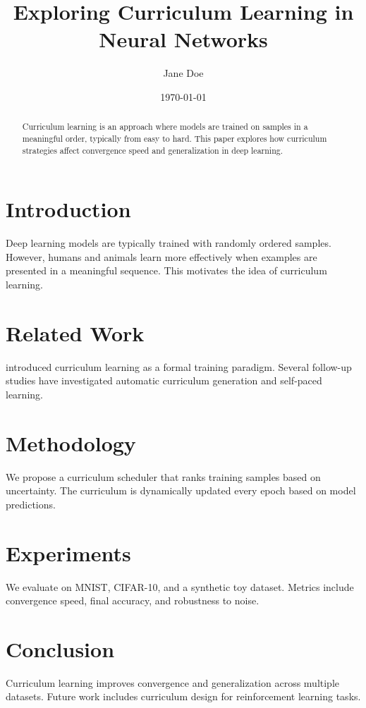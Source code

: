 \documentclass{article}
\title{Exploring Curriculum Learning in Neural Networks}
\author{Jane Doe}
\date{\today}
\begin{document}
\maketitle

\begin{abstract}
Curriculum learning is an approach where models are trained on samples in a meaningful order, typically from easy to hard. This paper explores how curriculum strategies affect convergence speed and generalization in deep learning.
\end{abstract}
 
\section{Introduction}

Deep learning models are typically trained with randomly ordered samples. However, humans and animals learn more effectively when examples are presented in a meaningful sequence. This motivates the idea of curriculum learning.

\section{Related Work}

\cite{bengio2009curriculum} introduced curriculum learning as a formal training paradigm. Several follow-up studies have investigated automatic curriculum generation and self-paced learning.

\section{Methodology}

We propose a curriculum scheduler that ranks training samples based on uncertainty. The curriculum is dynamically updated every epoch based on model predictions.

\section{Experiments}

We evaluate on MNIST, CIFAR-10, and a synthetic toy dataset. Metrics include convergence speed, final accuracy, and robustness to noise.

\section{Conclusion}

Curriculum learning improves convergence and generalization across multiple datasets. Future work includes curriculum design for reinforcement learning tasks.



\end{document}
